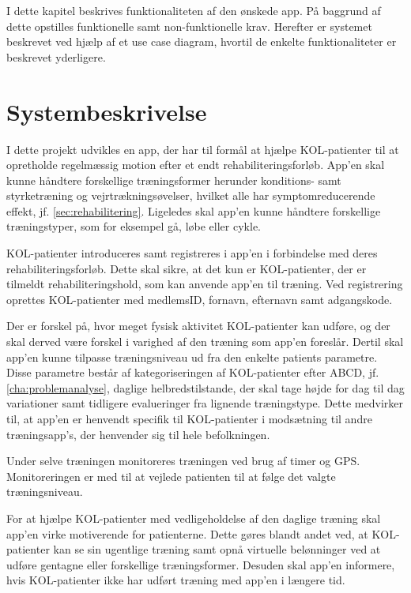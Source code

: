 I dette kapitel beskrives funktionaliteten af den ønskede app. På baggrund af dette opstilles funktionelle samt non-funktionelle krav. Herefter er systemet beskrevet ved hjælp af et use case diagram, hvortil de enkelte funktionaliteter er beskrevet yderligere. 

\section{Systembeskrivelse} \label{sec:systembeskrivelse}
I dette projekt udvikles en app, der har til formål at hjælpe KOL-patienter til at opretholde regelmæssig motion efter et endt rehabiliteringsforløb. App'en skal kunne håndtere forskellige træningsformer herunder konditions- samt styrketræning og vejrtrækningsøvelser, hvilket alle har symptomreducerende effekt, jf. \autoref{sec:rehabilitering}. Ligeledes skal app'en kunne håndtere forskellige træningstyper, som for eksempel gå, løbe eller cykle.

KOL-patienter introduceres samt registreres i app'en i forbindelse med deres rehabiliteringsforløb. 
Dette skal sikre, at det kun er KOL-patienter, der er tilmeldt rehabiliteringshold, som kan anvende app'en til træning. Ved registrering oprettes KOL-patienter med medlemsID, fornavn, efternavn samt adgangskode.  

Der er forskel på, hvor meget fysisk aktivitet KOL-patienter kan udføre, og der skal derved være forskel i varighed af den træning som app'en foreslår. Dertil skal app'en kunne tilpasse træningsniveau ud fra den enkelte patients parametre. Disse parametre består af kategoriseringen af KOL-patienter efter ABCD, jf. \autoref{cha:problemanalyse}, daglige helbredstilstande, der skal tage højde for dag til dag variationer samt tidligere evalueringer fra lignende træningstype. Dette medvirker til, at app'en er henvendt specifik til KOL-patienter i modsætning til andre træningsapp's, der henvender sig til hele befolkningen. 

Under selve træningen monitoreres træningen ved brug af timer og GPS. Monitoreringen er med til at vejlede patienten til at følge det valgte træningsniveau. 

For at hjælpe KOL-patienter med vedligeholdelse af den daglige træning skal app’en virke motiverende for patienterne. Dette gøres blandt andet ved, at KOL-patienter kan se sin ugentlige træning samt opnå virtuelle belønninger ved at udføre gentagne eller forskellige træningsformer. Desuden skal app'en informere, hvis KOL-patienter ikke har udført træning med app'en i længere tid. \citep{Gade2007, Tricomi2016}


